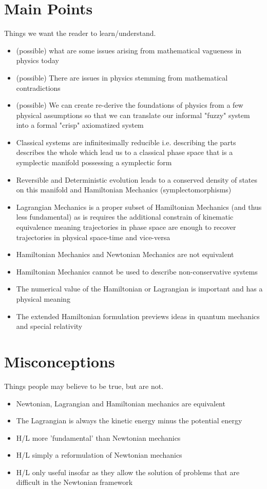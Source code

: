 \documentclass{article}
\begin{document}
\section{Main Points}
Things we want the reader to learn/understand.


\begin{itemize}
\item (possible) what are some issues arising from mathematical vagueness in physics today
\item (possible) There are issues in physics stemming from mathematical contradictions
\item (possible) We can create re-derive the foundations of physics from a few physical assumptions so that we can translate our informal "fuzzy" system into a formal "crisp" axiomatized system

	\item Classical systems are infinitesimally reducible i.e. describing the parts describes the whole which lead us to a classical phase space that is a symplectic manifold possessing a symplectic form
	\item Reversible and Deterministic evolution leads to a conserved density of states on this manifold and Hamiltonian Mechanics (symplectomorphisms) 
	\item Lagrangian Mechanics is a proper subset of Hamiltonian Mechanics (and thus less fundamental) as is requires the additional constrain of kinematic equivalence meaning trajectories in phase space are enough to recover trajectories in physical space-time and vice-versa
	\item Hamiltonian Mechanics and Newtonian Mechanics are not equivalent
	\item Hamiltonian Mechanics cannot be used to describe non-conservative systems
	\item The numerical value of the Hamiltonian or Lagrangian is important and has a physical meaning
	\item The extended Hamiltonian formulation previews ideas in quantum mechanics and special relativity
\end{itemize}


\section{Misconceptions}
Things people may believe to be true, but are not.

\begin{itemize}
	\item Newtonian, Lagrangian and Hamiltonian mechanics are equivalent
	\item The Lagrangian is always the kinetic energy minus the potential energy 
	\item H/L more 'fundamental' than Newtonian mechanics
	\item H/L simply a reformulation of Newtonian mechanics
	\item H/L only useful insofar as they allow the solution of problems that are difficult in the Newtonian framework
\end{itemize}
\end{document}
